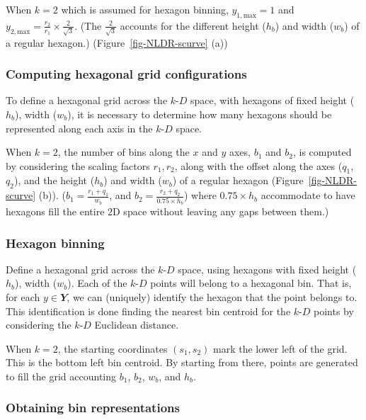 \documentclass[
  12pt]{article}
\newcommand\kD{$k\text{-}D$}
\begin{document}
When \(k=2\) which is assumed for hexagon binning,
\(y_{1,\text{max}}=1\) and
\(y_{2,\text{max}} = \frac{r_2}{r_1}\times \frac{2}{\sqrt{3}}\). (The
\(\frac{2}{\sqrt{3}}\) accounts for the different height (\(h_b\)) and
width (\(w_b\)) of a regular hexagon.) (Figure~\ref{fig-NLDR-scurve}
(a))

\subsubsection{Computing hexagonal grid
configurations}\label{computing-hexagonal-grid-configurations}

To define a hexagonal grid across the \kD{} space, with hexagons of
fixed height (\(h_b\)), width (\(w_b\)), it is necessary to determine
how many hexagons should be represented along each axis in the \kD{}
space.

When \(k=2\), the number of bins along the \(x\) and \(y\) axes, \(b_1\)
and \(b_2\), is computed by considering the scaling factors
\({r_1, r_2}\), along with the offset along the axes (\(q_1\), \(q_2\)),
and the height (\(h_b\)) and width (\(w_b\)) of a regular hexagon
(Figure~\ref{fig-NLDR-scurve} (b)). (\(b_1 = \frac{r_1 + q_1}{w_b}\),
and \(b_2 = \frac{r_2 + q_2}{0.75 \times h_b}\)) where
\(0.75 \times h_b\) accommodate to have hexagons fill the entire 2D
space without leaving any gaps between them.)

\subsubsection{Hexagon binning}\label{hexagon-binning}

Define a hexagonal grid across the \kD{} space, using hexagons with
fixed height (\(h_b\)), width (\(w_b\)). Each of the \kD{} points will
belong to a hexagonal bin. That is, for each \(y \in \mathbfit{Y}\), we
can (uniquely) identify the hexagon that the point belongs to. This
identification is done finding the nearest bin centroid for the \kD{}
points by considering the \kD{} Euclidean distance.

When \(k=2\), the starting coordinates \((s_1, s_2)\) mark the lower
left of the grid. This is the bottom left bin centroid. By starting from
there, points are generated to fill the grid accounting \(b_1\),
\(b_2\), \(w_b\), and \(h_b\).

\subsubsection{Obtaining bin
representations}\label{obtaining-bin-representations}
\end{document}
